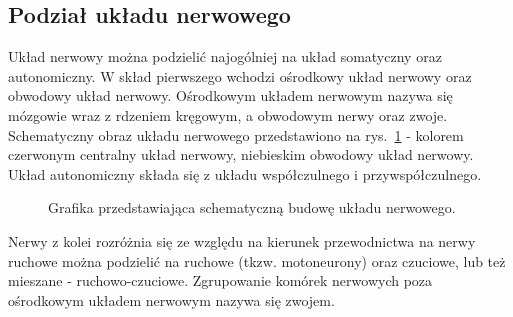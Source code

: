 \documentclass[twoside,a4paper]{book}
\begin{document}
\subsection{Podział układu nerwowego}
Układ nerwowy można podzielić najogólniej na układ somatyczny oraz autonomiczny. W skład pierwszego wchodzi ośrodkowy układ nerwowy oraz obwodowy układ nerwowy. Ośrodkowym układem nerwowym nazywa się mózgowie wraz z rdzeniem kręgowym, a obwodowym nerwy oraz zwoje. Schematyczny obraz układu nerwowego przedstawiono na rys.~\ref{fig:nervesystem} - kolorem czerwonym centralny układ nerwowy, niebieskim obwodowy układ nerwowy. Układ autonomiczny składa się z układu współczulnego i przywspółczulnego. \\
\begin{figure}[!h]

		\centering		
		\caption{Grafika przedstawiająca schematyczną budowę układu nerwowego. }
		\label{fig:nervesystem}
	\end{figure}
	
Nerwy z kolei rozróżnia się ze względu na kierunek przewodnictwa na nerwy ruchowe można podzielić na ruchowe (tkzw. motoneurony) oraz czuciowe, lub też mieszane - ruchowo-czuciowe. Zgrupowanie komórek nerwowych poza ośrodkowym układem nerwowym nazywa się zwojem. 

	
	
\end{document}
